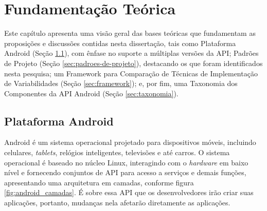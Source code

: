 \chapter{Fundamentação Teórica} \label{ch:fundamentacao-teorica}

Este capítulo apresenta uma visão geral das bases teóricas que fundamentam as
proposições  e  discussões  contidas  nesta  dissertação,  tais  como  Plataforma
Android (Seção \ref{sec:plataforma-android}), com ênfase no suporte a múltiplas
versões da API; Padrões de Projeto (Seção  \ref{sec:padroes-de-projeto}), 
destacando os que foram identificados nesta pesquisa; um Framework para Comparação
de Técnicas de Implementação de Variabilidades (Seção \ref{sec:framework}); e,
por fim, uma Taxonomia dos Componentes da API Android (Seção \ref{sec:taxonomia}). 

\section{Plataforma Android} \label{sec:plataforma-android}

Android é um sistema operacional projetado para dispositivos móveis, incluindo
celulares, \textit{tablets}, relógios inteligentes, televisões e até carros.
O sistema operacional é baseado no núcleo Linux, interagindo com o \textit{hardware}
em baixo nível e fornecendo conjuntos de API para acesso a serviços e demais
funções\cite{Lecheta2015}, apresentando uma arquitetura em camadas, conforme
figura \ref{fig:android_camadas}. É sobre essa API que os desenvolvedores irão
criar suas aplicações, portanto, mudanças nela afetarão diretamente as aplicações.

